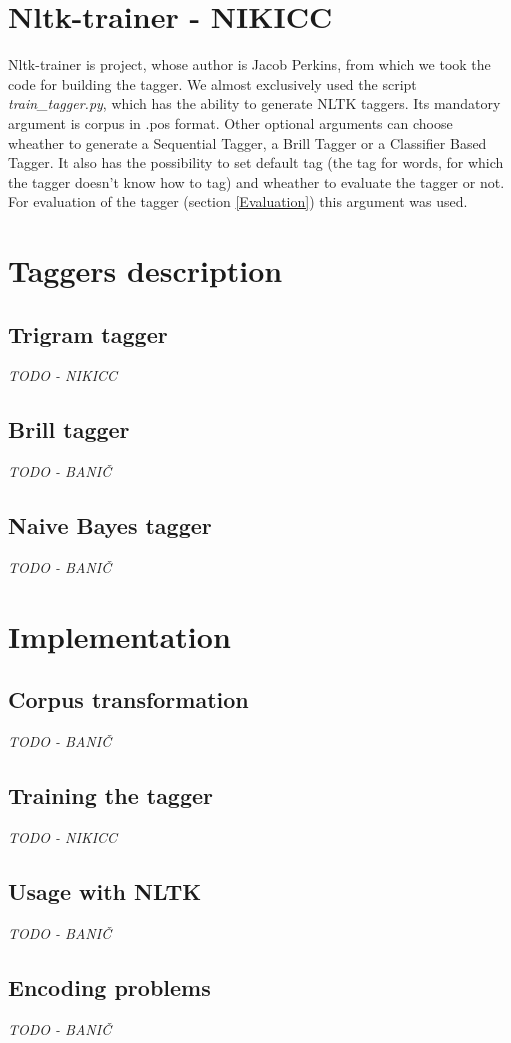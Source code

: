 \documentclass[11pt,a4paper,english,twocolumn]{article}
\begin{document}
\section{Nltk-trainer - NIKICC}
Nltk-trainer\cite{nltk-trainer} is project, whose author is Jacob Perkins, from which we took the code for building the tagger. We almost exclusively used the script \textit{train\_tagger.py}, which has the ability to generate NLTK taggers. Its mandatory argument is corpus in .pos format. Other optional arguments can choose wheather to generate a Sequential Tagger, a Brill Tagger or a Classifier Based Tagger. It also has the possibility to set default tag (the tag for words, for which the tagger doesn't know how to tag) and wheather to evaluate the tagger or not. For evaluation of the tagger (section \ref{Evaluation}) this argument was used. 
\section{Taggers description}
\subsection{Trigram tagger}
\textit{TODO - NIKICC}
\subsection{Brill tagger}
\textit{TODO - BANIČ}
\subsection{Naive Bayes tagger}
\textit{TODO - BANIČ}
\section{Implementation}
\subsection{Corpus transformation}
\textit{TODO - BANIČ}
\subsection{Training the tagger}
\textit{TODO - NIKICC}
\subsection{Usage with NLTK}
\textit{TODO - BANIČ}
\subsection{Encoding problems}
\textit{TODO - BANIČ}
\end{document}

